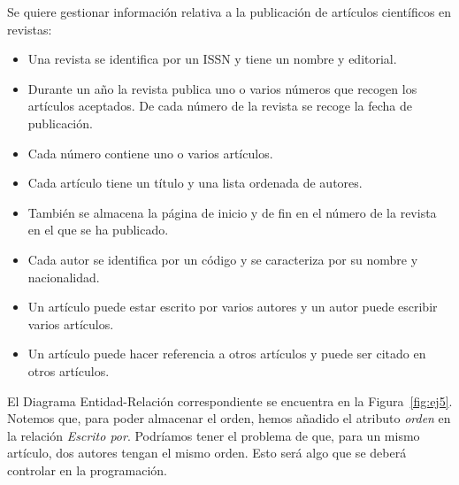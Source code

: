 \begin{ejercicio} \label{ej:5}
    Se quiere gestionar información relativa a la publicación de artículos científicos en revistas:
    \begin{itemize}
        \item Una revista se identifica por un ISSN y tiene un nombre y editorial.
        \item Durante un año la revista publica uno o varios números que recogen los artículos aceptados. De cada número de la revista se recoge la fecha de publicación.
        \item Cada número contiene uno o varios artículos.
        \item Cada artículo tiene un título y una lista ordenada de autores.
        \item También se almacena la página de inicio y de fin en el número de la revista en el que se ha publicado.
        \item Cada autor se identifica por un código y se caracteriza por su nombre y nacionalidad.
        \item Un artículo puede estar escrito por varios autores y un autor puede escribir varios artículos.
        \item Un artículo puede hacer referencia a otros artículos y puede ser citado en otros artículos.
    \end{itemize}

    El Diagrama Entidad-Relación correspondiente se encuentra en la Figura~\ref{fig:ej5}.
    Notemos que, para poder almacenar el orden, hemos añadido el atributo \emph{orden} en la relación \emph{Escrito por}.
    Podríamos tener el problema de que, para un mismo artículo, dos autores tengan el mismo orden. Esto será algo que se deberá controlar en la programación.
    \begin{figure}
        \centering
\end{figure}
\end{ejercicio}
